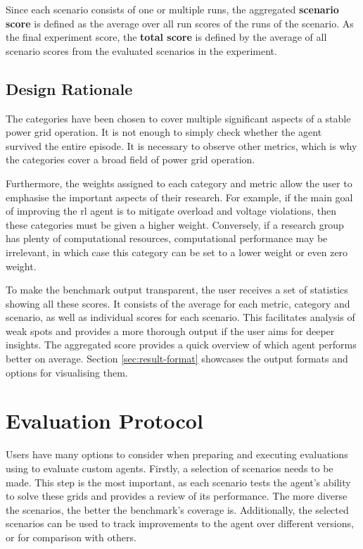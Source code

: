 Since each scenario consists of one or multiple runs, the aggregated \textbf{scenario score} is defined as the average over all run scores of the runs of the scenario. As the final experiment score, the \textbf{total score} is defined by the average of all scenario scores from the evaluated scenarios in the experiment.

\subsection{Design Rationale}
The \benchmark categories have been chosen to cover multiple significant aspects of a stable power grid operation. It is not enough to simply check whether the agent survived the entire episode. It is necessary to observe other metrics, which is why the categories cover a broad field of power grid operation. 

Furthermore, the weights assigned to each category and metric allow the user to emphasise the important aspects of their research. For example, if the main goal of improving the \ac{rl} agent is to mitigate overload and voltage violations, then these categories must be given a higher weight. Conversely, if a research group has plenty of computational resources, computational performance may be irrelevant, in which case this category can be set to a lower weight or even zero weight. 

To make the benchmark output transparent, the user receives a set of statistics showing all these scores. It consists of the average for each metric, category and scenario, as well as individual scores for each scenario. This facilitates analysis of weak spots and provides a more thorough output if the user aims for deeper insights. The aggregated score provides a quick overview of which agent performs better on average. Section \ref{sec:result-format} showcases the output formats and options for visualising them.

\section{Evaluation Protocol}\label{sec:evaluation-protocol}
Users have many options to consider when preparing and executing evaluations using \benchmark to evaluate custom agents. 
Firstly, a selection of scenarios needs to be made. This step is the most important, as each scenario tests the agent's ability to solve these grids and provides a review of its performance. The more diverse the scenarios, the better the benchmark's coverage is. Additionally, the selected scenarios can be used to track improvements to the agent over different versions, or for comparison with others. 

